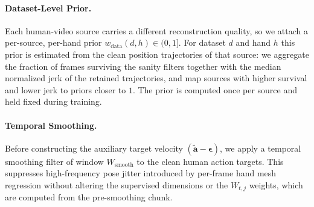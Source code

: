 \documentclass{llmxive}
\begin{document}
\paragraph{Dataset-Level Prior.}
Each human-video source carries a different reconstruction quality, so we attach a per-source, per-hand prior $w_{\mathrm{data}}(d,h) \in (0,1]$. For dataset $d$ and hand $h$ this prior is estimated from the clean position trajectories of that source: we aggregate the fraction of frames surviving the sanity filters together with the median normalized jerk of the retained trajectories, and map sources with higher survival and lower jerk to priors closer to $1$. The prior is computed once per source and held fixed during training.

\paragraph{Temporal Smoothing.}
Before constructing the auxiliary target velocity $(\tilde{\mathbf{a}} - \boldsymbol{\epsilon})$, we apply a temporal smoothing filter of window $W_{\mathrm{smooth}}$ to the clean human action targets. This suppresses high-frequency pose jitter introduced by per-frame hand mesh regression without altering the supervised dimensions or the $W_{t,j}$ weights, which are computed from the pre-smoothing chunk.
\end{document}
